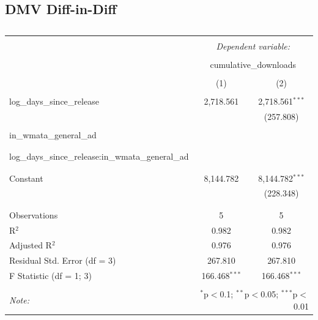 \documentclass[11pt, letterpaper, twoside]{article}
\begin{document}
\subsection{DMV Diff-in-Diff}


\begin{table}[!htbp] \centering 
  \caption{}
  \label{}
\begin{tabular}{@{\extracolsep{5pt}}lcc}
\\[-1.8ex]\hline
\hline \\[-1.8ex]
 & \multicolumn{2}{c}{\textit{Dependent variable:}} \\
\cline{2-3} 
\\[-1.8ex] & \multicolumn{2}{c}{cumulative\_downloads} \\
\\[-1.8ex] & (1) & (2)\\
\hline \\[-1.8ex]
 log\_days\_since\_release & 2,718.561 & 2,718.561$^{***}$ \\ 
  &  & (257.808) \\
  & & \\
 in\_wmata\_general\_ad &  &  \\
  &  &  \\
  & & \\
 log\_days\_since\_release:in\_wmata\_general\_ad &  &  \\
  &  &  \\
  & & \\
 Constant & 8,144.782 & 8,144.782$^{***}$ \\ 
  &  & (228.348) \\
  & & \\
\hline \\[-1.8ex]
Observations & 5 & 5 \\
R$^{2}$ & 0.982 & 0.982 \\
Adjusted R$^{2}$ & 0.976 & 0.976 \\
Residual Std. Error (df = 3) & 267.810 & 267.810 \\
F Statistic (df = 1; 3) & 166.468$^{***}$ & 166.468$^{***}$ \\ 
\hline
\hline \\[-1.8ex]
\textit{Note:}  & \multicolumn{2}{r}{$^{*}$p$<$0.1; $^{**}$p$<$0.05; $^{***}$p$<$0.01} \\
\end{tabular}
\end{table}
\end{document}
